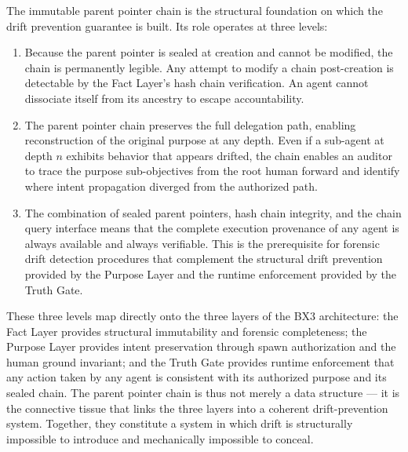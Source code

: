 The immutable parent pointer chain is the structural foundation on which the drift prevention guarantee is built. Its role operates at three levels:

\begin{enumerate}
\item[\textbf{Structural Immutability:}] Because the parent pointer is sealed at creation and cannot be modified, the chain is permanently legible. Any attempt to modify a chain post-creation is detectable by the Fact Layer's hash chain verification. An agent cannot dissociate itself from its ancestry to escape accountability.

\item[\textbf{Intent Preservation:}] The parent pointer chain preserves the full delegation path, enabling reconstruction of the original purpose at any depth. Even if a sub-agent at depth $n$ exhibits behavior that appears drifted, the chain enables an auditor to trace the purpose sub-objectives from the root human forward and identify where intent propagation diverged from the authorized path.

\item[\textbf{Forensic Completeness:}] The combination of sealed parent pointers, hash chain integrity, and the chain query interface means that the complete execution provenance of any agent is always available and always verifiable. This is the prerequisite for forensic drift detection procedures that complement the structural drift prevention provided by the Purpose Layer and the runtime enforcement provided by the Truth Gate.
\end{enumerate}

These three levels map directly onto the three layers of the BX3 architecture: the Fact Layer provides structural immutability and forensic completeness; the Purpose Layer provides intent preservation through spawn authorization and the human ground invariant; and the Truth Gate provides runtime enforcement that any action taken by any agent is consistent with its authorized purpose and its sealed chain. The parent pointer chain is thus not merely a data structure — it is the connective tissue that links the three layers into a coherent drift-prevention system. Together, they constitute a system in which drift is structurally impossible to introduce and mechanically impossible to conceal.
